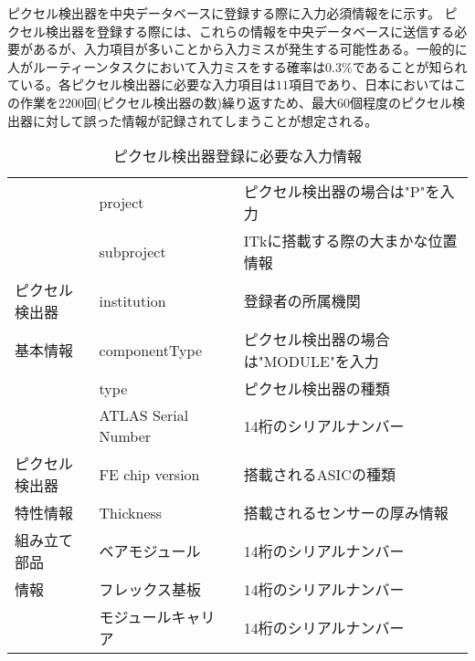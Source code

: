 ピクセル検出器を中央データベースに登録する際に入力必須情報をに示す。
ピクセル検出器を登録する際には、これらの情報を中央データベースに送信する必要があるが、入力項目が多いことから入力ミスが発生する可能性ある。一般的に人がルーティーンタスクにおいて入力ミスをする確率は$0.3\%$であることが知られている\cite{human}。各ピクセル検出器に必要な入力項目は$11$項目であり、日本においてはこの作業を$2200$回(ピクセル検出器の数)繰り返すため、最大$60$個程度のピクセル検出器に対して誤った情報が記録されてしまうことが想定される。

\begin{table}[tbp]
  \begin{center}
    \caption[ピクセル検出器登録に必要な入力情報]{ピクセル検出器登録に必要な入力情報}
    \label{tab:nyuuryoku}
    \begin{tabular}{|l||l|l|}
    \hline
    & project &  ピクセル検出器の場合は"P"を入力 \\
    \cline{2-3}
    & subproject & ITkに搭載する際の大まかな位置情報 \\
    \cline{2-3}
    ピクセル検出器
    & institution & 登録者の所属機関 \\
    \cline{2-3}
    基本情報
    & componentType & ピクセル検出器の場合は"MODULE"を入力 \\
    \cline{2-3}
    & type & ピクセル検出器の種類 \\
    \cline{2-3}
    & ATLAS Serial Number & 14桁のシリアルナンバー \\
    \hline
    ピクセル検出器
    & FE chip version & 搭載されるASICの種類 \\
    \cline{2-3}
    特性情報 & Thickness & 搭載されるセンサーの厚み情報 \\
    \hline
    組み立て部品 & ベアモジュール & 14桁のシリアルナンバー \\
    \cline{2-3}
    情報 & フレックス基板 & 14桁のシリアルナンバー \\
    \cline{2-3}
     & モジュールキャリア & 14桁のシリアルナンバー \\
    \hline
    \end{tabular}
  \end{center}
\end{table}

